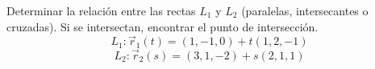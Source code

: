 Determinar la relación entre las rectas $L_1$ y $L_2$ (paralelas, intersecantes o cruzadas). Si se intersectan, encontrar el punto de intersección.
\[ L_1: \vec{r}_1(t) = (1, -1, 0) + t(1, 2, -1) \]
\[ L_2: \vec{r}_2(s) = (3, 1, -2) + s(2, 1, 1) \]